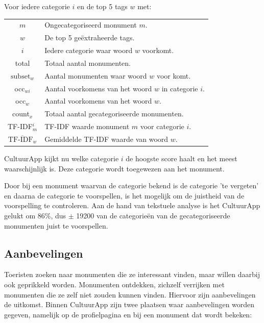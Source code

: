 \documentclass[a4paper,10pt]{article}
\begin{document}
	\noindent Voor iedere categorie $i$ en de top 5 tags $w$ met:
	
	\begin{center}
			\begin{tabular}{ c | l }
				$m$ & Ongecategoriseerd monument $m$.\\
				$w$ & De top 5 ge\"extraheerde tags.\\
				$i$ & Iedere categorie waar woord $w$ voorkomt.\\
				total & Totaal aantal monumenten.\\
				$\text{subset}_w$ & Aantal monumenten waar woord $w$ voor komt.\\
				occ$_{wi}$ & Aantal voorkomens van het woord $w$ in categorie $i$. \\
			  	occ$_{w}$ & Aantal voorkomens van het woord $w$.\\
				count$_x$ & Totaal aantal gecategoriseerde monumenten.\\
				TF-IDF$_m^i$ & TF-IDF waarde monument $m$ voor categorie $i$.\\
			$\overline{\text{TF-IDF}_w}$ & Gemiddelde TF-IDF waarde van woord $w$.
		
			
			\end{tabular}
		\end{center}
	
	\noindent CultuurApp kijkt nu welke categorie $i$ de hoogste score haalt en het meest waarschijnlijk is. Deze categorie wordt toegewezen aan het monument.
	
	Door bij een monument waarvan de categorie bekend is de categorie 'te vergeten' en daarna de categorie te voorspellen, is het mogelijk om de juistheid van de voorspelling te controleren. Aan de hand van tekstuele analyse is het CultuurApp gelukt om 86\%, dus $\pm$ 19200 van de categorie\"en van de gecategoriseerde monumenten juist te voorspellen.
		
	\subsection{Aanbevelingen}
	Toeristen zoeken naar monumenten die ze interessant vinden, maar willen daarbij ook geprikkeld worden. Monumenten ontdekken, zichzelf verrijken met monumenten die ze zelf niet zouden kunnen vinden. Hiervoor zijn aanbevelingen de uitkomst. Binnen CultuurApp zijn twee plaatsen waar aanbevelingen worden gegeven, namelijk op de profielpagina en bij een monument dat wordt bekeken:
	
\end{document}
